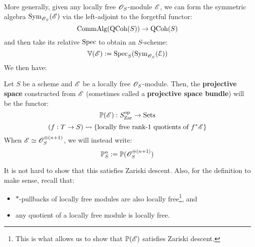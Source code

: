             More generally, given any locally free $\mathscr{O}_S$-module $\mathscr{E}$, we can form the symmetric algebra $\mathrm{Sym}_{\mathscr{O}_S}(\mathscr{E})$ via the left-adjoint to the forgetful functor:
                $$\mathrm{Comm}\mathrm{Alg}(\mathrm{QCoh}(S)) \to \mathrm{QCoh}(S)$$
            and then take its relative $\operatorname{Spec}$ to obtain an $S$-scheme:
                $$\mathbb{V}(\mathscr{E}) := \operatorname{Spec}_S( \mathrm{Sym}_{\mathscr{O}_S}(\mathcal{E}) )$$
            We then have:
            \begin{definition} \label{def: projective_space_functor_of_points}
                Let $S$ be a scheme and $\mathscr{E}$ be a locally free $\mathscr{O}_S$-module. Then, the \textbf{projective space} constructed from $\mathscr{E}$ (sometimes called a \textbf{projective space bundle}) will be the functor:
                    $$\mathbb{P}(\mathscr{E}): S_{\mathrm{Zar}}^{\mathrm{op}} \to \mathrm{Sets}$$
                    $$(f: T \to S) \leadsto \{ \text{locally free rank-$1$ quotients of $f^* \mathscr{E}$} \}$$
                When $\mathscr{E} \simeq \mathscr{O}_S^{\oplus (n + 1)}$, we will instead write:
                    $$\mathbb{P}^n_S := \mathbb{P}(\mathscr{O}_S^{\oplus (n + 1)})$$
            \end{definition}
            It is not hard to show that this satisfies Zariski descent. Also, for the definition to make sense, recall that:
            \begin{itemize}
                \item $*$-pullbacks of locally free modules are also locally free\footnote{This is what allows us to show that $\mathbb{P}(\mathscr{E})$ satisfies Zariski descent.}, and
                \item any quotient of a locally free module is locally free.
            \end{itemize}
    
